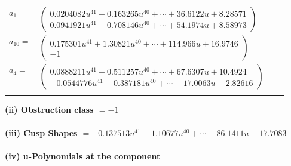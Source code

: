 \documentclass[1p]{elsarticle_modified}
\theoremstyle{definition}
\begin{document}
\begin{tabular}{m{7pt} m{180pt} m{7pt} m{180pt} }
\flushright $a_{1}=$&$\begin{pmatrix}0.0204082 u^{41}+0.163265 u^{40}+\cdots+36.6122 u+8.28571\\0.0941921 u^{41}+0.708146 u^{40}+\cdots+54.1974 u+8.58973\end{pmatrix}$ \\
\flushright $a_{10}=$&$\begin{pmatrix}0.175301 u^{41}+1.30821 u^{40}+\cdots+114.966 u+16.9746\\-1\end{pmatrix}$ \\
\flushright $a_{4}=$&$\begin{pmatrix}0.0888211 u^{41}+0.511257 u^{40}+\cdots+67.6307 u+10.4924\\-0.0544776 u^{41}-0.387181 u^{40}+\cdots-17.0063 u-2.82616\end{pmatrix}$\\&\end{tabular}
\flushleft \textbf{(ii) Obstruction class $= -1$}\\~\\
\flushleft \textbf{(iii) Cusp Shapes $= -0.137513 u^{41}-1.10677 u^{40}+\cdots-86.1411 u-17.7083$}\\~\\
\newpage\renewcommand{\arraystretch}{1}
\flushleft \textbf{(iv) u-Polynomials at the component}\newline \\
\end{document}
